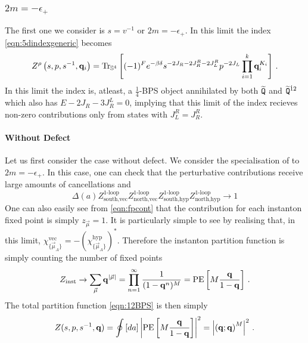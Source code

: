 \documentclass[main.tex]{subfiles}
\begin{document}
\subsubsection{\boldmath $2m=-\epsilon_+$}
The first one we consider is $s=v^{-1}$ or $2m=-\epsilon_+$. In this limit the index \eqref{eqn:5dindexgeneric} becomes
\begin{equation}\label{eqn:12BPS}
Z^{\rho}\left(s,p,s^{-1},\mathbf{q}_i\right)=\operatorname{Tr}_{\mathbb{S}^4}\left[(-1)^Fe^{-\beta\delta}s^{-2J_R-2J_R^R-2J_L^R}p^{-2J_L}\prod_{i=1}^k\mathbf{q}^{K_i}_i\right]\,.
\end{equation}
In this limit the index is, atleast, a $\frac{1}{4}$-BPS object annihilated by both $\widetilde{\mathtt{Q}}$ and $\widetilde{\mathtt{Q}}^{\dot12}$ which also has $E-2J_R-3J_R^L=0$, implying that this limit of the index recieves non-zero contributions only from states with $J_L^R=J_R^R$.

\paragraph{Without Defect}
Let us first consider the case without defect. We consider the specialisation of to $2m=-\epsilon_+$. 
In this case, one can check that the perturbative contributions receive large amounts of cancellations and 
\begin{equation}
\Delta(a)Z^{\text{1-loop}}_{\text{south},\text{vec}}Z^{\text{1-loop}}_{\text{north},\text{vec}}Z^{\text{1-loop}}_{\text{south},\text{hyp}}Z^{\text{1-loop}}_{\text{north},\text{hyp}}\to1
\end{equation}
One can also easily see from \eqref{eqn:fpcont} that the contribution for each instanton fixed point is simply $z_{\vec\mu}=1$. It is particularly simple to see by realising that, in this limit, $\chi_{\{\vec{\mu}_A\}}^{\text{vec}}=-\left(\chi_{\{\vec{\mu}_A\}}^{\text{hyp}}\right)^*$. Therefore the instanton partition function is simply counting the number of fixed points
\begin{equation}
Z_{\text{inst}}\to\sum_{\vec{\mu}}\mathbf{q}^{|\vec{\mu}|}=\prod_{n=1}^{\infty}\frac{1}{(1-\mathbf{q}^n)^{M}}=\operatorname{\mathrm{PE}}\left[M\frac{\mathbf{q}}{1-\mathbf{q}}\right]\,.
\end{equation}
The total partition function \eqref{eqn:12BPS} is then simply
\begin{equation}
Z(s,p,s^{-1},\mathbf{q})=\oint\left[da\right]\left|\operatorname{\mathrm{PE}}\left[M\frac{\mathbf{q}}{1-\mathbf{q}}\right]\right|^2=\left|\left(\mathbf{q};\mathbf{q}\right)^M\right|^{2}\,.
\end{equation} 
\end{document}
